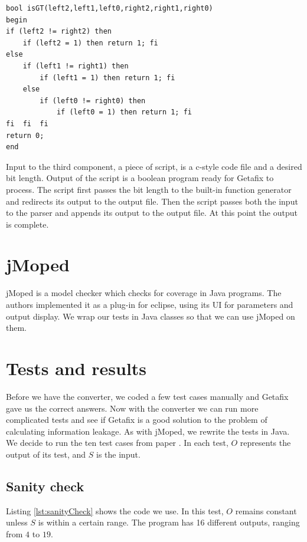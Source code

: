 \lstset{language=C}  
\begin{lstlisting}[caption={Greater than operator as a function in boolean program with bit length of 2.},label=lst:isGT]
bool isGT(left2,left1,left0,right2,right1,right0)
begin
if (left2 != right2) then
	if (left2 = 1) then return 1; fi
else 
	if (left1 != right1) then
		if (left1 = 1) then	return 1; fi
	else 
		if (left0 != right0) then
			if (left0 = 1) then	return 1; fi
fi	fi	fi
return 0;
end
\end{lstlisting}

Input to the third component, a piece of script, is a c-style code file and a desired bit length. Output of the script is a boolean program ready for Getafix to process. The script first passes the bit length to the built-in function generator and redirects its output to the output file. Then the script passes both the input to the parser and appends its output to the output file. At this point the output is complete.

\section {jMoped}
jMoped is a model checker which checks for coverage in Java programs. The authors implemented it as a plug-in for eclipse, using its UI for parameters and output display. We wrap our tests in Java classes so that we can use jMoped on them.

\section{Tests and results}
Before we have the converter, we coded a few test cases manually and Getafix gave us the correct answers. Now with the converter we can run more complicated tests and see if Getafix is a good solution to the problem of calculating information leakage. As with jMoped, we rewrite the tests in Java. We decide to run the ten test cases from paper \cite{meng_calculating_2011}. In each test, $O$ represents the output of its test, and $S$ is the input.
 
\subsection{Sanity check}
Listing \ref{lst:sanityCheck} shows the code we use. In this test, $O$ remains constant unless $S$ is within a certain range. The program has 16 different outputs, ranging from $4$ to $19$.

